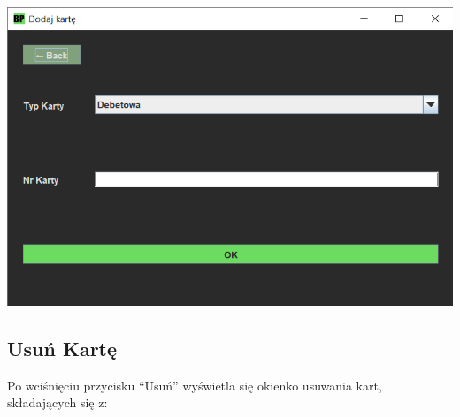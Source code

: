 \documentclass[12pt, letterpaper]{article}
\begin{document}
\begin{center}
	\includegraphics[scale=0.6]{dodaj}
\end{center}

\newpage

\subsection{Usuń Kartę}

\quad Po wciśnięciu przycisku “Usuń” wyświetla się okienko usuwania kart, składających się z:
\end{document}
